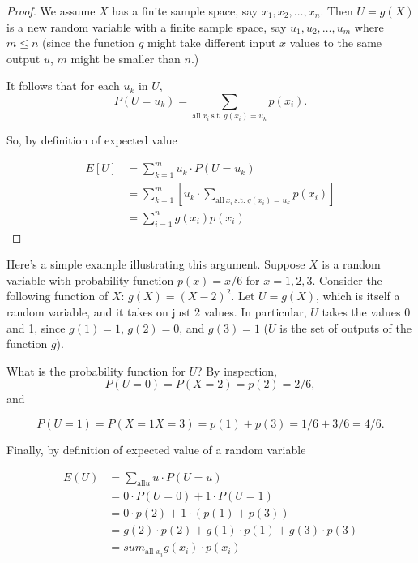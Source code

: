 \documentclass[
]{book}
\theoremstyle{definition}
\theoremstyle{definition}
\theoremstyle{definition}
\theoremstyle{definition}
\theoremstyle{remark}
\begin{document}
\begin{proof}
We assume \(X\) has a finite sample space, say \(x_1, x_2, \ldots, x_n\). Then \(U = g(X)\) is a new random variable with a finite sample space, say \(u_1, u_2, \ldots, u_m\) where \(m \leq n\) (since the function \(g\) might take different input \(x\) values to the same output \(u\), \(m\) might be smaller than \(n\).)

It follows that for each \(u_k\) in \(U\),
\[P(U = u_k) = \sum_{\text{all}~ x_i ~\text{s.t.}~ g(x_i) = u_k} p(x_i).\]

So, by definition of expected value

\begin{align*}
E[U] &= \sum_{k = 1}^m u_k\cdot P(U = u_k) \\
     &= \sum_{k = 1}^m \left[ u_k\cdot \sum_{\text{all}~ x_i ~\text{s.t.}~ g(x_i) = u_k} p(x_i)\right] \\
     &= \sum_{i = 1}^n g(x_i) p(x_i)
\end{align*}
\end{proof}

Here's a simple example illustrating this argument. Suppose \(X\) is a random variable with probability function \(p(x) = x/6\) for \(x = 1, 2, 3\). Consider the following function of \(X\): \(g(X) = (X-2)^2\). Let \(U = g(X)\), which is itself a random variable, and it takes on just 2 values. In particular, \(U\) takes the values 0 and 1, since \(g(1) = 1\), \(g(2) = 0\), and \(g(3) = 1\) (\(U\) is the set of outputs of the function \(g\)).

What is the probability function for \(U\)? By inspection,
\[P(U = 0) = P(X = 2) = p(2) = 2/6,\]
and

\[P(U = 1) = P(X = 1 X = 3) = p(1) + p(3) = 1/6 + 3/6 = 4/6.\]

Finally, by definition of expected value of a random variable

\begin{align*}
E(U) &= \sum_{\text{all} u} u \cdot P(U = u)\\
     &= 0\cdot P(U = 0) + 1 \cdot P(U = 1) \\
     &= 0 \cdot p(2) + 1 \cdot (p(1)+p(3)) \\
     &= g(2) \cdot p(2) + g(1) \cdot p(1) + g(3) \cdot p(3) \\
     &= sum_{\text{all }x_i} g(x_i)\cdot p(x_i)
\end{align*}
\end{document}
